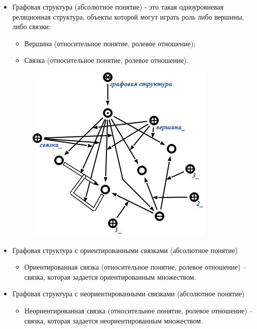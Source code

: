 \begin{itemize}
\item Графовая структура (абсолютное понятие) - это такая
  одноуровневая реляционная структура, объекты которой могут играть
  роль либо вершины, либо связки:
  \begin{itemize}
  \item Вершина (относительное понятие, ролевое отношение);
  \item Связка (относительное понятие, ролевое отношение).
  \end{itemize}

  \begin{figure}[h!]
    \centering
    \includegraphics[scale=0.3]{images/2/concept/Graph_structure}
    \label{fig:Concept_Graph_structure}
  \end{figure}


\item Графовая структура с ориентированными связками (абсолютное
  понятие)
  \begin{itemize}
  \item Ориентированная связка (относительное понятие, ролевое
    отношение) – связка, которая задается ориентированным множеством.
  \end{itemize}

\item Графовая структура с неориентированными связками (абсолютное
  понятие)
  \begin{itemize}
  \item Неориентированная связка (относительное понятие, ролевое
    отношение) – связка, которая задается неориентированным
    множеством.
  \end{itemize}


\end{itemize}
